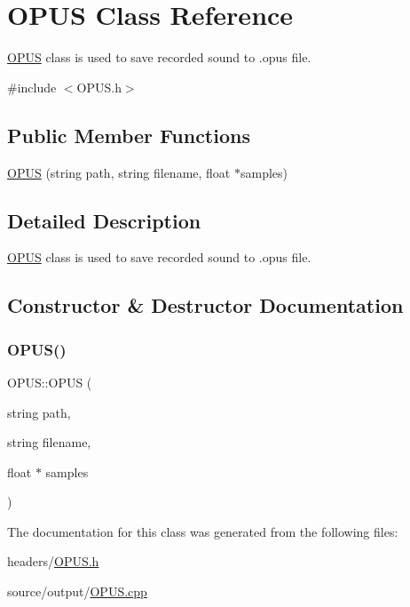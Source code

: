 \hypertarget{class_o_p_u_s}{}\section{O\+P\+US Class Reference}
\label{class_o_p_u_s}


\hyperlink{class_o_p_u_s}{O\+P\+US} class is used to save recorded sound to .opus file.  




{\ttfamily \#include $<$O\+P\+U\+S.\+h$>$}

\subsection*{Public Member Functions}
\begin{DoxyCompactItemize}
\item 
\hyperlink{class_o_p_u_s_ac55dbacce8cf692cb5160e36d6c71a4f}{O\+P\+US} (string path, string filename, float $\ast$samples)
\end{DoxyCompactItemize}


\subsection{Detailed Description}
\hyperlink{class_o_p_u_s}{O\+P\+US} class is used to save recorded sound to .opus file. 

\subsection{Constructor \& Destructor Documentation}
\mbox{\label{class_o_p_u_s_ac55dbacce8cf692cb5160e36d6c71a4f}} 
\subsubsection{\texorpdfstring{O\+P\+U\+S()}{OPUS()}}
{\footnotesize\ttfamily O\+P\+U\+S\+::\+O\+P\+US (\begin{DoxyParamCaption}\item[{string}]{path,  }\item[{string}]{filename,  }\item[{float $\ast$}]{samples }\end{DoxyParamCaption})}



The documentation for this class was generated from the following files\+:\begin{DoxyCompactItemize}
\item 
headers/\hyperlink{_o_p_u_s_8h}{O\+P\+U\+S.\+h}\item 
source/output/\hyperlink{_o_p_u_s_8cpp}{O\+P\+U\+S.\+cpp}\end{DoxyCompactItemize}
